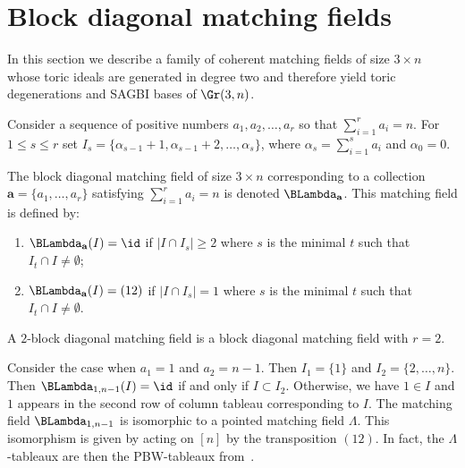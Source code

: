 \section{Block diagonal matching fields}\label{sec:block}

In this section we describe a family of coherent matching fields of size $3 \times n$ whose toric ideals are generated in degree two and therefore yield toric degenerations and SAGBI bases of $\Gr(3,n)$. 



Consider a sequence of positive numbers $ a_1, a_2, \ldots, a_{r}$ so that $\sum_{i = 1}^r a_i = n$. For $1 \leq s\leq r$ set 
$I_s = \{\alpha_{s-1}+1, \alpha_{s-1} +2, \ldots, \alpha_{s}\}$,
where $\alpha_{s} = \sum_{i = 1}^{s} a_{i }$ and $\alpha_0 = 0$. 

\begin{Definition}\label{def:blockdiagcolumns}

The block diagonal matching field of size $3 \times n$ corresponding to a collection $\mathbf{a} = \{a_1, \ldots, a_{r}\}$ satisfying $\sum_{i = 1}^r a_i = n$ is denoted $\BLambda_{\mathbf{a}}$. This matching field is defined by:
\begin{enumerate}

\item $\BLambda_{\mathbf{a}}(I) = \id$ if $|I \cap I_s| \geq 2$ where $s$ is the minimal $t$ such that $I_t \cap I \neq \emptyset$;

\item \label{transpose} $\BLambda_{\mathbf{a}}(I) = (12)$ if $|I \cap I_s| = 1$ where $s$ is the minimal $t$ such that $I_t \cap I \neq \emptyset$. 

 \end{enumerate}
 A $2$-block diagonal matching field is a block diagonal matching field with $r = 2$. 
\end{Definition}

\begin{exam}
Consider the case when $a_1 = 1 $ and $a_2 = n-1$. Then $I_1 = \{1\}$ and $I_2 = \{2, \ldots , n\}$. 
Then $\BLambda_{1, n-1}(I) = \id$ if and only if $I \subset I_2$. Otherwise, we have $1 \in I$ and $1$ appears in the second row of column tableau corresponding to $I$.
The matching field $\BLambda_{1,n-1}$ is isomorphic to a pointed matching field $\Lambda$. This isomorphism is given by acting on $[n]$ by the transposition $(12)$. 
In fact, the $\Lambda$-tableaux are then the PBW-tableaux from~\cite{Feigen}.
 \end{exam}



 
